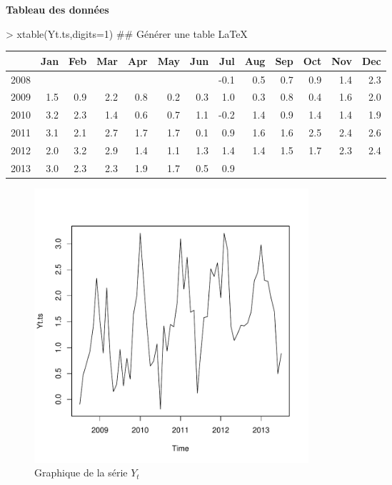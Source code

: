 \documentclass{article}
\begin{document}
\textbf{Tableau des données} 
\begin{Schunk}
\begin{Sinput}
> xtable(Yt.ts,digits=1) ## Générer une table LaTeX
\end{Sinput}
\begin{table}[ht]
\centering
\begin{tabular}{rrrrrrrrrrrrr}
  \hline
 & Jan & Feb & Mar & Apr & May & Jun & Jul & Aug & Sep & Oct & Nov & Dec \\ 
  \hline
2008 &  &  &  &  &  &  & -0.1 & 0.5 & 0.7 & 0.9 & 1.4 & 2.3 \\ 
  2009 & 1.5 & 0.9 & 2.2 & 0.8 & 0.2 & 0.3 & 1.0 & 0.3 & 0.8 & 0.4 & 1.6 & 2.0 \\ 
  2010 & 3.2 & 2.3 & 1.4 & 0.6 & 0.7 & 1.1 & -0.2 & 1.4 & 0.9 & 1.4 & 1.4 & 1.9 \\ 
  2011 & 3.1 & 2.1 & 2.7 & 1.7 & 1.7 & 0.1 & 0.9 & 1.6 & 1.6 & 2.5 & 2.4 & 2.6 \\ 
  2012 & 2.0 & 3.2 & 2.9 & 1.4 & 1.1 & 1.3 & 1.4 & 1.4 & 1.5 & 1.7 & 2.3 & 2.4 \\ 
  2013 & 3.0 & 2.3 & 2.3 & 1.9 & 1.7 & 0.5 & 0.9 &  &  &  &  &  \\ 
   \hline
\end{tabular}
\end{table}\end{Schunk}
\begin{figure}[p]
  \centering
  \includegraphics[height=4in, width=4in]{exercice1-graph1.pdf}
  \caption{Graphique de la série $Y_t$}
  \label{fig:exercice1-graph1}
\end{figure}
\end{document}
